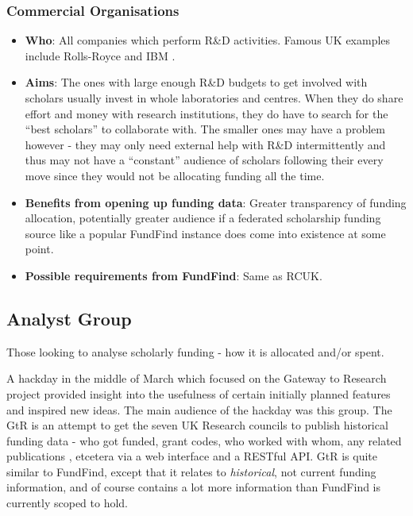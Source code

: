 \subsubsection{Commercial Organisations}

\begin{itemize}
 \item \textbf{Who}: All companies which perform R\&D activities. Famous UK examples include Rolls-Royce \cite{rolls-royce} and IBM \cite{ibm}.
 \item \textbf{Aims}: The ones with large enough R\&D budgets to get involved with scholars usually invest in whole laboratories and centres. When they do share effort and money with research institutions, they do have to search for the ``best scholars'' to collaborate with. The smaller ones may have a problem however - they may only need external help with R\&D intermittently and thus may not have a ``constant'' audience of scholars following their every move since they would not be allocating funding all the time.
 \item \textbf{Benefits from opening up funding data}: Greater transparency of funding allocation, potentially greater audience if a federated scholarship funding source like a popular FundFind instance does come into existence at some point.
 \item \textbf{Possible requirements from FundFind}: Same as RCUK.
\end{itemize}

\subsection{Analyst Group}
\label{audience-analyst}
Those looking to analyse scholarly funding - how it is allocated and/or spent.

A hackday in the middle of March which focused on the Gateway to Research project provided insight into the usefulness of certain initially planned features and inspired new ideas. The main audience of the hackday was this group. The GtR is an attempt to get the seven UK Research councils to publish historical funding data - who got funded, grant codes, who worked with whom, any related publications \cite{gtr}, etcetera via a web interface and a RESTful API. GtR is quite similar to FundFind, except that it relates to \emph{historical}, not current funding information, and of course contains a lot more information than FundFind is currently scoped to hold.

